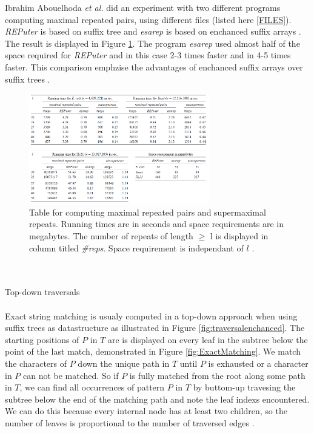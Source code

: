 \documentclass[12pt]{article} %
\begin{document}
Ibrahim Abouelhoda \emph{et al.} did an experiment with two different programs computing maximal repeated pairs, using different files (listed here \ref{FILES})\cite{enchancedsuffix}. \emph{REPuter} is based on suffix tree and \emph{esarep} is based on enchanced suffix arrays \cite{enchancedsuffix}. The result is displayed in Figure \ref{fig:ButtomUp}.
The program \emph{esarep} used almost half of the space required for \emph{REPuter} and in this case 2-3 times faster and in 4-5 times faster. This comparison emphzise the advantages of enchanced suffix arrays over suffix trees \cite{enchancedsuffix}.
\begin{figure}[H]
    \centering
    \includegraphics[width=0.7\textwidth]{ButtomUp}
    \captionsetup{width=0.8\textwidth}
    \caption{Table for computing maximal repeated pairs and supermaximal repeats. Running times are in seconds and space requirements are in megabytes. The number of repeats of length $\geq$ l is displayed in column titled \emph{\#reps}. Space requirement is independant of $l$ \cite{enchancedsuffix}.}
    \label{fig:ButtomUp}
\end{figure}
\\ \\
Top-down traversals
\\ \\
Exact string matching is usualy computed in a top-down approach when using suffix trees as datastructure as illustrated in Figure \ref{fig:traversalenchanced}.
The starting positions of $P$ in $T$ are is displayed on every leaf in the subtree below the point of the last match, demonstrated in Figure \ref{fig:ExactMatching}. We match the characters of $P$ down the unique path in $T$ until $P$ is exhausted or a character in $P$ can not be matched. So if $P$ is fully matched from the root along some path in $T$, we can find all occurrences of pattern $P$ in $T$ by buttom-up travesing the subtree below the end of the matching path and note the leaf indexs encountered. We can do this because every internal node has at least two children, so the number of leaves is proportional to the number of traversed edges \cite{gusfield}.
\end{document}
